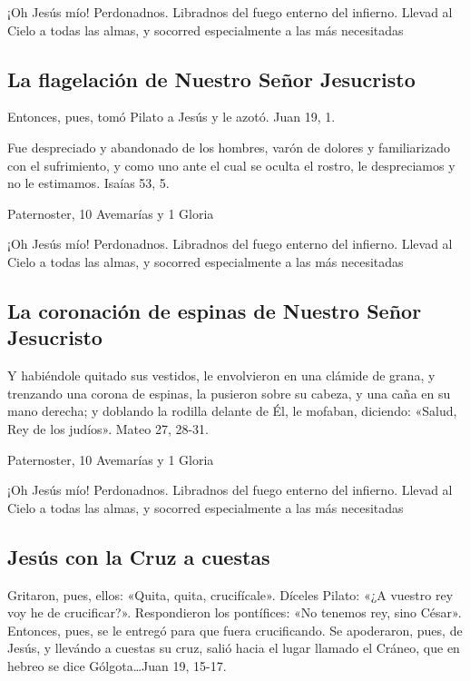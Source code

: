 \documentclass[a4paper,11pt, oneside]{report}
\begin{document}
      \medskip
      ¡Oh Jesús mío! Perdonadnos. Libradnos del fuego enterno del infierno. Llevad al Cielo a todas las almas, y socorred especialmente a las más 
      necesitadas
    
    \subsection*{La flagelación de Nuestro Señor Jesucristo}
      Entonces, pues, tomó Pilato a Jesús y le azotó. Juan 19, 1.
      
      \medskip
      Fue despreciado y abandonado de los hombres, varón de dolores y familiarizado con el sufrimiento, y como uno ante el cual
      se oculta el rostro, le despreciamos y no le estimamos. Isaías 53, 5.
      
       Paternoster, 10 Avemarías y 1 Gloria
      
      \medskip
      ¡Oh Jesús mío! Perdonadnos. Libradnos del fuego enterno del infierno. Llevad al Cielo a todas las almas, y socorred especialmente a las más 
      necesitadas
    
    \subsection*{La coronación de espinas de Nuestro Señor Jesucristo}

      Y habiéndole quitado sus vestidos, le envolvieron en una clámide de grana, y trenzando una corona de espinas, la pusieron sobre su cabeza, y una
      caña en su mano derecha; y doblando la rodilla delante de Él, le mofaban, diciendo: «Salud, Rey de los judíos». Mateo 27, 28-31.
      
       Paternoster, 10 Avemarías y 1 Gloria
      
      \medskip
      ¡Oh Jesús mío! Perdonadnos. Libradnos del fuego enterno del infierno. Llevad al Cielo a todas las almas, y socorred especialmente a las más 
      necesitadas
  
    \subsection*{Jesús con la Cruz a cuestas}
      Gritaron, pues, ellos: «Quita, quita, crucifícale». Díceles Pilato: «¿A vuestro rey voy he de crucificar?». Respondieron los pontífices: «No tenemos rey,
      sino César». Entonces, pues, se le entregó para que fuera crucificando. Se apoderaron, pues, de Jesús, y llevándo a cuestas su cruz, salió hacia el lugar
      llamado el Cráneo, que en hebreo se dice Gólgota\ldots Juan 19, 15-17.
\end{document}
